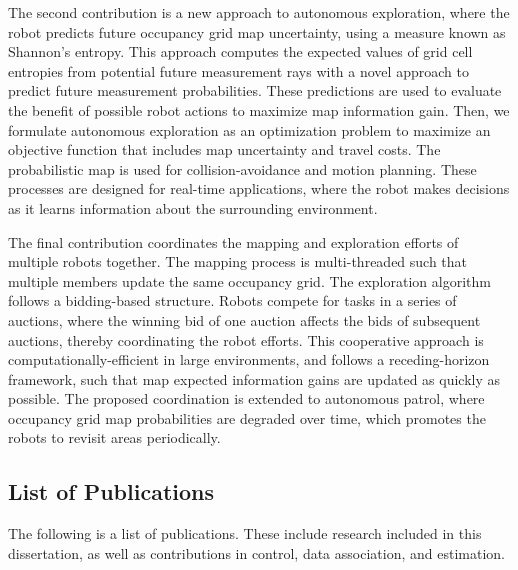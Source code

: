 The second contribution is a new approach to autonomous exploration, where the robot predicts future occupancy grid map uncertainty, using a measure known as Shannon's entropy. This approach computes the expected values of grid cell entropies from potential future measurement rays with a novel approach to predict future measurement probabilities. These predictions are used to evaluate the benefit of possible robot actions to maximize map information gain. Then, we formulate autonomous exploration as an optimization problem to maximize an objective function that includes map uncertainty and travel costs. The probabilistic map is used for collision-avoidance and motion planning. These processes are designed for real-time applications, where the robot makes decisions as it learns information about the surrounding environment.

The final contribution coordinates the mapping and exploration efforts of multiple robots together. The mapping process is multi-threaded such that multiple members update the same occupancy grid. The exploration algorithm follows a bidding-based structure. Robots compete for tasks in a series of auctions, where the winning bid of one auction affects the bids of subsequent auctions, thereby coordinating the robot efforts. This cooperative approach is computationally-efficient in large environments, and follows a receding-horizon framework, such that map expected information gains are updated as quickly as possible. The proposed coordination is extended to autonomous patrol, where occupancy grid map probabilities are degraded over time, which promotes the robots to revisit areas periodically.

\subsection{List of Publications}

The following is a list of publications. These include research included in this dissertation, as well as contributions in control, data association, and estimation.


